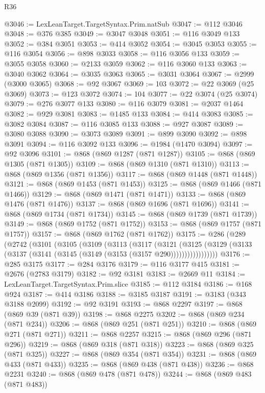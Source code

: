 \begin{lexlean}{R36}
\begin{coremodule}
@3046 := LexLeanTarget.TargetSyntax.Prim.natSub
@3047 := @112 @3046
@3048 := @376 @385
@3049 := @3047 @3048
@3051 := @116 @3049 @133
@3052 := @384 @3051
@3053 := @414 @3052
@3054 := @3045 @3053
@3055 := @116 @3054
@3056 := @898 @3033
@3058 := @116 @3056 @133
@3059 := @3055 @3058
@3060 := @2133 @3059
@3062 := @116 @3060 @133
@3063 := @3040 @3062
@3064 := @3035 @3063
@3065 := @3031 @3064
@3067 := @2999 (@3000 @3065)
@3068 := @92 @3067
@3069 := 103
@3072 := @22 @3069 (@25 @3069)
@3073 := @123 @3072
@3074 := 104
@3077 := @22 @3074 (@25 @3074)
@3079 := @276 @3077 @133
@3080 := @116 @3079
@3081 := @2037 @1464
@3082 := @929 @3081
@3083 := @1485 @133
@3084 := @414 @3083
@3085 := @3082 @3084
@3087 := @116 @3085 @133
@3088 := @927 @3087
@3089 := @3080 @3088
@3090 := @3073 @3089
@3091 := @899 @3090
@3092 := @898 @3091
@3094 := @116 @3092 @133
@3096 := @1984 (@1470 @3094)
@3097 := @92 @3096
@3101 := @868 (@869 @1287 (@871 @1287))
@3105 := @868 (@869 @1305 (@871 @1305))
@3109 := @868 (@869 @1310 (@871 @1310))
@3113 := @868 (@869 @1356 (@871 @1356))
@3117 := @868 (@869 @1448 (@871 @1448))
@3121 := @868 (@869 @1453 (@871 @1453))
@3125 := @868 (@869 @1466 (@871 @1466))
@3129 := @868 (@869 @1471 (@871 @1471))
@3133 := @868 (@869 @1476 (@871 @1476))
@3137 := @868 (@869 @1696 (@871 @1696))
@3141 := @868 (@869 @1734 (@871 @1734))
@3145 := @868 (@869 @1739 (@871 @1739))
@3149 := @868 (@869 @1752 (@871 @1752))
@3153 := @868 (@869 @1757 (@871 @1757))
@3157 := @868 (@869 @1762 (@871 @1762))
@3175 := @286
    (@289
      (@2742
        (@3101
          (@3105
            (@3109
              (@3113
                (@3117
                  (@3121
                    (@3125
                      (@3129 (@3133 (@3137 (@3141 (@3145 (@3149 (@3153 (@3157 @290)))))))))))))))))
@3176 := @285 @3175
@3177 := @284 @3176
@3179 := @116 @3177 @415
@3181 := @2676 (@2783 @3179)
@3182 := @92 @3181
@3183 := @2669 @11
@3184 := LexLeanTarget.TargetSyntax.Prim.slice
@3185 := @112 @3184
@3186 := @168 @924
@3187 := @414 @3186
@3188 := @3185 @3187
@3191 := @3183 (@343 @3188 @2099)
@3192 := @92 @3191
@3193 := @868 @2297
@3197 := @868 (@869 @39 (@871 @39))
@3198 := @868 @2275
@3202 := @868 (@869 @234 (@871 @234))
@3206 := @868 (@869 @251 (@871 @251))
@3210 := @868 (@869 @271 (@871 @271))
@3211 := @868 @2257
@3215 := @868 (@869 @296 (@871 @296))
@3219 := @868 (@869 @318 (@871 @318))
@3223 := @868 (@869 @325 (@871 @325))
@3227 := @868 (@869 @354 (@871 @354))
@3231 := @868 (@869 @433 (@871 @433))
@3235 := @868 (@869 @438 (@871 @438))
@3236 := @868 @2231
@3240 := @868 (@869 @478 (@871 @478))
@3244 := @868 (@869 @483 (@871 @483))

\end{coremodule}
\end{lexlean}
